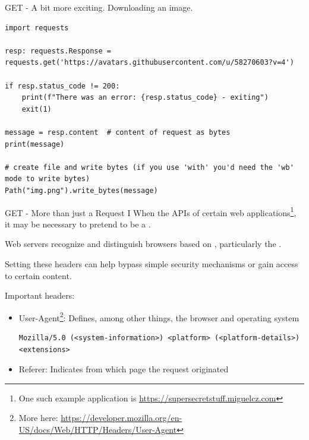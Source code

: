\documentclass[12pt, aspectratio=169, usepdftitle=false]{beamer}
\begin{document}
\begin{frame}[fragile]{GET - A bit more exciting. Downloading an image.}
	
	\begin{lstlisting}[language=pytiny]
import requests

resp: requests.Response = requests.get('https://avatars.githubusercontent.com/u/58270603?v=4')

if resp.status_code != 200:
    print(f"There was an error: {resp.status_code} - exiting")
    exit(1)

message = resp.content  # content of request as bytes
print(message)

# create file and write bytes (if you use 'with' you'd need the 'wb' mode to write bytes)
Path("img.png").write_bytes(message)
	\end{lstlisting}
\end{frame}

\begin{frame}[fragile]{GET - More than just a Request I}
		When  the APIs of certain web applications\footnote{One such example application is \url{https://supersecretstuff.miguelcz.com}}, it may be necessary to pretend to be a .
		\pause
		
		\medskip
		
		Web servers recognize and distinguish browsers based on , particularly the .
		\pause
		
		\medskip
		
		Setting these headers can help bypass simple security mechanisms or gain access to certain content.
		\pause
		
		\medskip
		
		Important headers:
		\begin{itemize}
			\item User-Agent\footnote{More here: \url{https://developer.mozilla.org/en-US/docs/Web/HTTP/Headers/User-Agent}}: Defines, among other things, the browser and operating system
			\begin{lstlisting}[language=pytiny]
Mozilla/5.0 (<system-information>) <platform> (<platform-details>) <extensions>
			\end{lstlisting}
			\item Referer: Indicates from which page the request originated
		\end{itemize}
\end{frame}
\end{document}
